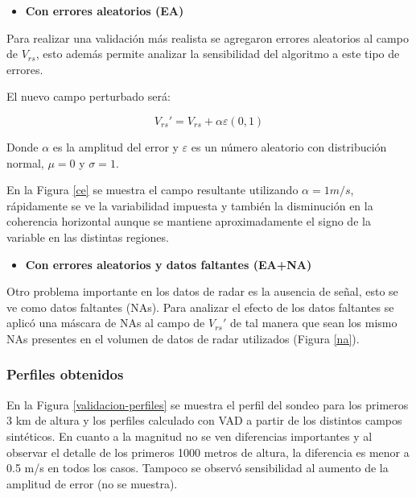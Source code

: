 \documentclass[12pt,spanish,oneside]{book}
\providecommand{\tightlist}{%
  \setlength{\itemsep}{0pt}\setlength{\parskip}{0pt}}
\begin{document}
\begin{itemize}
\tightlist
\item
  \textbf{Con errores aleatorios (EA)}
\end{itemize}

Para realizar una validación más realista se agregaron errores
aleatorios al campo de \(V_{rs}\), esto además permite analizar la
sensibilidad del algoritmo a este tipo de errores.

El nuevo campo perturbado será:

\begin{equation} \label{eq-vr12}
V_{rs}'  = V_{rs} + \alpha \varepsilon(0,1)
\end{equation}

Donde \(\alpha\) es la amplitud del error y \(\varepsilon\) es un número
aleatorio con distribución normal, \(\mu = 0\) y \(\sigma= 1\).

En la Figura \ref{ce} se muestra el campo resultante utilizando
\(\alpha = 1 m/s\), rápidamente se ve la variabilidad impuesta y también
la disminución en la coherencia horizontal aunque se mantiene
aproximadamente el signo de la variable en las distintas regiones.

\begin{itemize}
\tightlist
\item
  \textbf{Con errores aleatorios y datos faltantes (EA+NA)}
\end{itemize}

Otro problema importante en los datos de radar es la ausencia de señal,
esto se ve como datos faltantes (NAs). Para analizar el efecto de los
datos faltantes se aplicó una máscara de NAs al campo de \(V_{rs}'\) de
tal manera que sean los mismo NAs presentes en el volumen de datos de
radar utilizados (Figura \ref{na}).

\subsubsection{Perfiles obtenidos}\label{perfiles-obtenidos}

En la Figura \ref{validacion-perfiles} se muestra el perfil del sondeo
para los primeros 3 km de altura y los perfiles calculado con VAD a
partir de los distintos campos sintéticos. En cuanto a la magnitud no se
ven diferencias importantes y al observar el detalle de los primeros
1000 metros de altura, la diferencia es menor a 0.5 m/s en todos los
casos. Tampoco se observó sensibilidad al aumento de la amplitud de
error (no se muestra).
\end{document}
